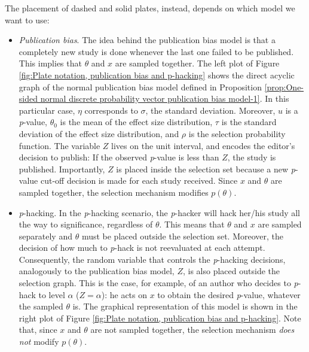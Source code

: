 \documentclass{article}
\theoremstyle{plain}
\theoremstyle{definition}
\begin{document}
The placement of dashed and solid plates, instead, depends on which model we want to use:
\begin{itemize}
\item \textit{Publication bias}. The idea behind the publication bias model is that a completely new study is done whenever the last one failed to be published. This implies that $\theta$ and $x$ are sampled together. The left plot of Figure \ref{fig:Plate notation, publication bias and p-hacking} shows the direct acyclic graph of the normal publication bias model defined in Proposition \ref{prop:One-sided normal discrete probability vector publication bias model-1}. In this particular case, $\eta$ corresponds to $\sigma$, the standard deviation. Moreover, $u$ is a \textit{p}-value, $\theta_{0}$ is the mean of the effect size distribution, $\tau$ is the standard deviation of the effect size distribution, and $\rho$ is the selection probability function. The variable $Z$ lives on the unit interval, and encodes the editor's decision to publish: If the observed \textit{p}-value is less than $Z$, the study is published. Importantly, $Z$ is placed inside the selection set because a new \textit{p}-value cut-off decision is made for each study received. Since $x$ and $\theta$ are sampled together, the selection mechanism modifies $p\left(\theta\right)$.%

\item \textit{p}-hacking. In the \textit{p}-hacking scenario, the \textit{p}-hacker will hack her/his study all the way to significance, regardless of $\theta$. This means that $\theta$ and $x$ are sampled separately and $\theta$ must be placed outside the selection set. Moreover, the decision of how much to \textit{p}-hack is not reevaluated at each attempt. Consequently, the random variable that controls the \textit{p}-hacking decisions, analogously to the publication bias model, $Z$, is also placed outside the selection graph. This is the case, for example, of an author who decides to \textit{p}-hack to level $\alpha$ ($Z = \alpha$): he acts on $x$ to obtain the desired \textit{p}-value, whatever the sampled $\theta$ is. The graphical representation of this model is shown in the right plot of Figure \ref{fig:Plate notation, publication bias and p-hacking}. Note that, since $x$ and $\theta$ are not sampled together, the selection mechanism \emph{does not} modify $p\left(\theta\right)$.
\end{itemize}
\end{document}

